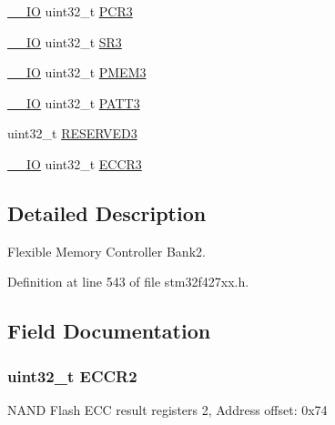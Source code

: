 \begin{DoxyCompactItemize}
\hyperlink{core__sc300_8h_aec43007d9998a0a0e01faede4133d6be}{\+\_\+\+\_\+\+IO} uint32\+\_\+t \hyperlink{struct_f_m_c___bank2__3___type_def_a73861fa74b83973fa1b5f92735c042ef}{P\+C\+R3}
\item 
\hyperlink{core__sc300_8h_aec43007d9998a0a0e01faede4133d6be}{\+\_\+\+\_\+\+IO} uint32\+\_\+t \hyperlink{struct_f_m_c___bank2__3___type_def_af30c34f7c606cb9416a413ec5fa36491}{S\+R3}
\item 
\hyperlink{core__sc300_8h_aec43007d9998a0a0e01faede4133d6be}{\+\_\+\+\_\+\+IO} uint32\+\_\+t \hyperlink{struct_f_m_c___bank2__3___type_def_aba8981e4f06cfb3db7d9959242052f80}{P\+M\+E\+M3}
\item 
\hyperlink{core__sc300_8h_aec43007d9998a0a0e01faede4133d6be}{\+\_\+\+\_\+\+IO} uint32\+\_\+t \hyperlink{struct_f_m_c___bank2__3___type_def_aba03fea9c1bb2242d963e29f1b94d25e}{P\+A\+T\+T3}
\item 
uint32\+\_\+t \hyperlink{struct_f_m_c___bank2__3___type_def_af2b40c5e36a5e861490988275499e158}{R\+E\+S\+E\+R\+V\+E\+D3}
\item 
\hyperlink{core__sc300_8h_aec43007d9998a0a0e01faede4133d6be}{\+\_\+\+\_\+\+IO} uint32\+\_\+t \hyperlink{struct_f_m_c___bank2__3___type_def_a6062be7dc144c07e01c303cb49d69ce2}{E\+C\+C\+R3}
\end{DoxyCompactItemize}


\subsection{Detailed Description}
Flexible Memory Controller Bank2. 

Definition at line 543 of file stm32f427xx.\+h.



\subsection{Field Documentation}
\subsubsection[{\texorpdfstring{E\+C\+C\+R2}{ECCR2}}]{ uint32\+\_\+t E\+C\+C\+R2}\hypertarget{struct_f_m_c___bank2__3___type_def_a05a47a1664adc7a3db3fa3e83fe883b4}{}\label{struct_f_m_c___bank2__3___type_def_a05a47a1664adc7a3db3fa3e83fe883b4}
N\+A\+ND Flash E\+CC result registers 2, Address offset\+: 0x74 

